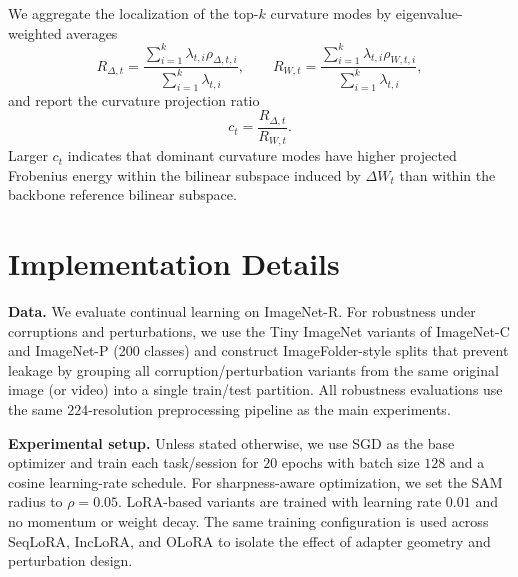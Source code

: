 \documentclass{article}
\theoremstyle{plain}
\theoremstyle{definition}
\theoremstyle{remark}
\begin{document}
We aggregate the localization of the top-$k$ curvature modes by eigenvalue-weighted averages
\[
R_{\Delta,t}=\frac{\sum_{i=1}^k \lambda_{t,i}\rho_{\Delta,t,i}}{\sum_{i=1}^k \lambda_{t,i}},
\qquad
R_{W,t}=\frac{\sum_{i=1}^k \lambda_{t,i}\rho_{W,t,i}}{\sum_{i=1}^k \lambda_{t,i}},
\]
and report the curvature projection ratio
\[
c_t=\frac{R_{\Delta,t}}{R_{W,t}}.
\]
Larger $c_t$ indicates that dominant curvature modes have higher projected Frobenius energy within the bilinear subspace induced by $\Delta W_t$ than within the backbone reference bilinear subspace.






\section{Implementation Details}


\noindent\textbf{Data.}
We evaluate continual learning on ImageNet-R. For robustness under corruptions and perturbations, we use the Tiny ImageNet variants of ImageNet-C and ImageNet-P (200 classes) and construct ImageFolder-style splits that prevent leakage by grouping all corruption/perturbation variants from the same original image (or video) into a single train/test partition. All robustness evaluations use the same $224$-resolution preprocessing pipeline as the main experiments.

\noindent\textbf{Experimental setup.}
Unless stated otherwise, we use SGD as the base optimizer and train each task/session for $20$ epochs with batch size $128$ and a cosine learning-rate schedule. For sharpness-aware optimization, we set the SAM radius to $\rho=0.05$. LoRA-based variants are trained with learning rate $0.01$ and no momentum or weight decay. The same training configuration is used across SeqLoRA, IncLoRA, and OLoRA to isolate the effect of adapter geometry and perturbation design.
\end{document}
